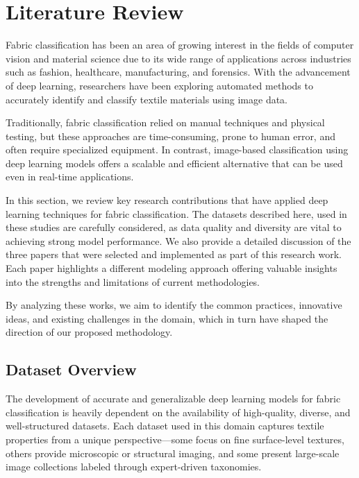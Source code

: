 \section{Literature Review}

Fabric classification has been an area of growing interest in the fields of computer vision and material science due to its wide range of applications across industries such as fashion, healthcare, manufacturing, and forensics. With the advancement of deep learning, researchers have been exploring automated methods to accurately identify and classify textile materials using image data.

Traditionally, fabric classification relied on manual techniques and physical testing, but these approaches are time-consuming, prone to human error, and often require specialized equipment. In contrast, image-based classification using deep learning models offers a scalable and efficient alternative that can be used even in real-time applications.

In this section, we review key research contributions that have applied deep learning techniques for fabric classification. The datasets described here, used in these studies are carefully considered, as data quality and diversity are vital to achieving strong model performance. We also provide a detailed discussion of the three papers that were selected and implemented as part of this research work. Each paper highlights a different modeling approach offering valuable insights into the strengths and limitations of current methodologies.

By analyzing these works, we aim to identify the common practices, innovative ideas, and existing challenges in the domain, which in turn have shaped the direction of our proposed methodology.

\subsection{Dataset Overview}

The development of accurate and generalizable deep learning models for fabric classification is heavily dependent on the availability of high-quality, diverse, and well-structured datasets. Each dataset used in this domain captures textile properties from a unique perspective—some focus on fine surface-level textures, others provide microscopic or structural imaging, and some present large-scale image collections labeled through expert-driven taxonomies.

